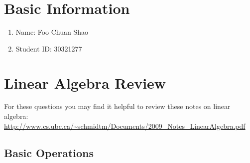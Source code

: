\documentclass{article}
\def\blu#1{{\color{blu}#1}}
\def\enum#1{\begin{enumerate}#1\end{enumerate}}
\begin{document}
\section*{Basic Information}


\blu{\enum{
\item Name: Foo Chuan Shao
\item Student ID: 30321277
}
}

\pagebreak

\section{Linear Algebra Review}

For these questions you may find it helpful to review these notes on linear algebra:\\
\url{http://www.cs.ubc.ca/~schmidtm/Documents/2009_Notes_LinearAlgebra.pdf}

\subsection{Basic Operations}
\end{document}
